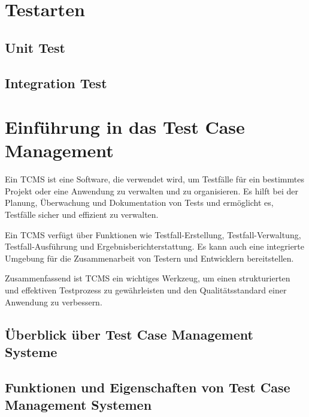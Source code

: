 \documentclass[a4paper, fontsize=11pt, parskip=half, twoside]{scrreprt}
\begin{document}
	
	
	\section{Testarten}
	
	\subsection{Unit Test}
	
	\subsection{Integration Test}
	
	
	\section{Einführung in das Test Case Management}
	
	Ein \ac{TCMS} ist eine Software, die verwendet wird, um Testfälle für ein bestimmtes Projekt oder eine Anwendung zu verwalten und zu organisieren. 
	Es hilft bei der Planung, Überwachung und Dokumentation von Tests und ermöglicht es, Testfälle sicher und effizient zu verwalten.
	
	Ein \ac{TCMS} verfügt über Funktionen wie Testfall-Erstellung, Testfall-Verwaltung, Testfall-Ausführung und Ergebnisberichterstattung. 
	Es kann auch eine integrierte Umgebung für die Zusammenarbeit von Testern und Entwicklern bereitstellen.
	
	Zusammenfassend ist \ac{TCMS} ein wichtiges Werkzeug, um einen strukturierten und effektiven Testprozess zu gewährleisten und den Qualitätsstandard einer Anwendung zu verbessern.
	
	\subsection{Überblick über Test Case Management Systeme}
	
	\subsection{Funktionen und Eigenschaften von Test Case Management Systemen}
	
\end{document}
